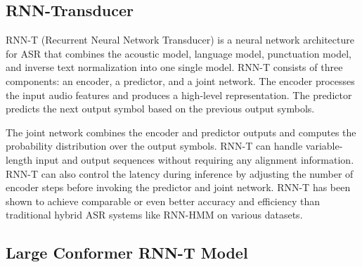 \documentclass[9pt,final,a4paper]{IEEEtran}
\begin{document}
\subsection{RNN-Transducer}

\begin{figure}[H]
    \centering
\end{figure}

RNN-T (Recurrent Neural Network Transducer) is a neural network architecture for ASR that combines the acoustic model, language model, punctuation model, and inverse text normalization into one single model\cite{cite3}.
RNN-T consists of three components: an encoder, a predictor, and a joint network.
The encoder processes the input audio features and produces a high-level representation.
The predictor predicts the next output symbol based on the previous output symbols.

The joint network combines the encoder and predictor outputs and computes the probability distribution over the output symbols.
RNN-T can handle variable-length input and output sequences without requiring any alignment information\cite{cite3}.
RNN-T can also control the latency during inference by adjusting the number of encoder steps before invoking the predictor and joint network.
RNN-T has been shown to achieve comparable or even better accuracy and efficiency than traditional hybrid ASR systems like RNN-HMM on various datasets.

\subsection{Large Conformer RNN-T Model}
\end{document}
